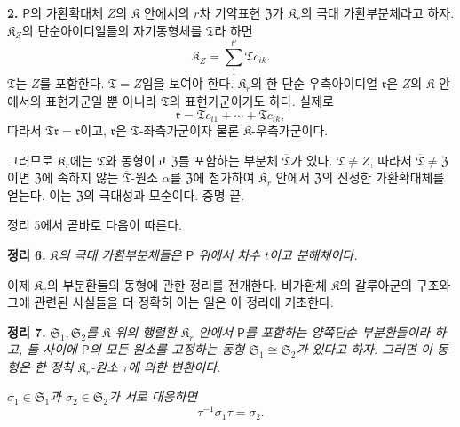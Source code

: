 \textbf{2.} \(\mathsf P\)의 가환확대체 \(Z\)의 \(\mathfrak K\) 안에서의 \(r\)차 기약표현 \(\mathfrak Z\)가 \(\mathfrak K_r\)의 극대 가환부분체라고 하자. \(\mathfrak K_Z\)의 단순아이디얼들의 자기동형체를 \(\mathfrak T\)라 하면
\[
        \mathfrak K_Z
        =\sum_{1}^{t'}\mathfrak T c_{ik}.
\]
\(\mathfrak T\)는 \(Z\)를 포함한다. \(\mathfrak T=Z\)임을 보여야 한다. \(\mathfrak K_r\)의 한 단순 우측아이디얼 \(\mathfrak r\)은 \(Z\)의 \(\mathfrak K\) 안에서의 표현가군일 뿐 아니라 \(\mathfrak T\)의 표현가군이기도 하다. 실제로
\[
        \mathfrak r
        =\mathfrak T c_{i1}+\cdots+\mathfrak T c_{ik},
\]
따라서 \(\mathfrak T\mathfrak r=\mathfrak r\)이고, \(\mathfrak r\)은 \(\mathfrak T\)-좌측가군이자 물론 \(\mathfrak K\)-우측가군이다.

그러므로 \(\mathfrak K_r\)에는 \(\mathfrak T\)와 동형이고 \(\mathfrak Z\)를 포함하는 부분체 \(\overline{\mathfrak T}\)가 있다. \(\mathfrak T\ne Z\), 따라서 \(\overline{\mathfrak T}\ne\mathfrak Z\)이면 \(\mathfrak Z\)에 속하지 않는 \(\overline{\mathfrak T}\)-원소 \(\alpha\)를 \(\mathfrak Z\)에 첨가하여 \(\mathfrak K_r\) 안에서 \(\mathfrak Z\)의 진정한 가환확대체를 얻는다. 이는 \(\mathfrak Z\)의 극대성과 모순이다. 증명 끝.

정리 5에서 곧바로 다음이 따른다.

\textbf{정리 6.} \emph{\(\mathfrak K\)의 극대 가환부분체들은 \(\mathsf P\) 위에서 차수 \(t\)이고 분해체이다.}

이제 \(\mathfrak K_r\)의 부분환들의 동형에 관한 정리를 전개한다. 비가환체 \(\mathfrak K\)의 갈루아군의 구조와 그에 관련된 사실들을 더 정확히 아는 일은 이 정리에 기초한다.

\textbf{정리 7.} \emph{\(\mathfrak S_1,\mathfrak S_2\)를 \(\mathfrak K\) 위의 행렬환 \(\mathfrak K_r\) 안에서 \(\mathsf P\)를 포함하는 양쪽단순 부분환들이라 하고, 둘 사이에 \(\mathsf P\)의 모든 원소를 고정하는 동형 \(\mathfrak S_1\cong\mathfrak S_2\)가 있다고 하자. 그러면 이 동형은 한 정칙 \(\mathfrak K_r\)-원소 \(\tau\)에 의한 변환이다.}

\emph{\(\sigma_1\in\mathfrak S_1\)과 \(\sigma_2\in\mathfrak S_2\)가 서로 대응하면}
\[
        \tau^{-1}\sigma_1\tau=\sigma_2.
\]

